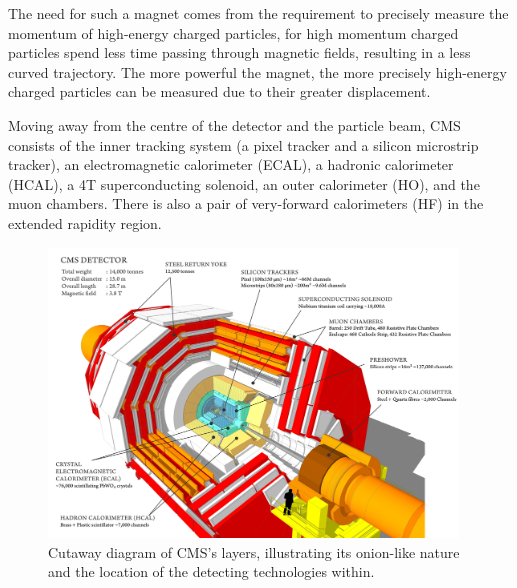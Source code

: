 The need for such a magnet comes from the requirement to precisely measure the momentum of high-energy charged particles, for high momentum charged particles spend less time passing through magnetic fields, resulting in a less curved trajectory.
The more powerful the magnet, the more precisely high-energy charged particles can be measured due to their greater displacement\cite{oldcms}.

Moving away from the centre of the detector and the particle beam, CMS consists of the inner tracking system (a pixel tracker and a silicon microstrip tracker), an electromagnetic calorimeter (ECAL), a hadronic calorimeter (HCAL), a 4T superconducting solenoid, an outer calorimeter (HO), and the muon chambers.
There is also a pair of very-forward calorimeters (HF) in the extended rapidity region\cite{oldcms}.

\begin{figure}[htbp]
\begin{center}
\includegraphics[width=0.97\textwidth]{figs/cms/cms_120918_03.png}
\caption{Cutaway diagram of CMS’s layers, illustrating its onion-like nature and the location of the detecting technologies within.}
\label{fig:cern-accelerator-complex}
\end{center}
\end{figure}

